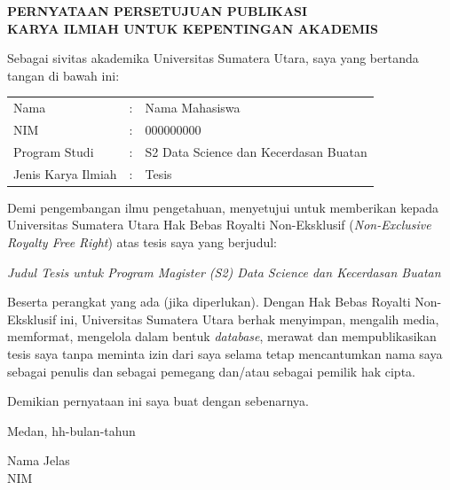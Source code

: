 \thispagestyle{empty}
\begin{center}
{\bfseries PERNYATAAN PERSETUJUAN PUBLIKASI\\
KARYA ILMIAH UNTUK KEPENTINGAN AKADEMIS\par}
\vspace{18mm}
\end{center}

\noindent Sebagai sivitas akademika Universitas Sumatera Utara, saya yang bertanda tangan di bawah ini:

\vspace{6mm}
\noindent
\begin{tabular}{@{}p{3.5cm}@{}l@{\;}l@{}}
Nama            & : & Nama Mahasiswa \\
NIM             & : & 000000000 \\
Program Studi   & : & S2 Data Science dan Kecerdasan Buatan \\
Jenis Karya Ilmiah & : & Tesis \\
\end{tabular}

\vspace{6mm}
\noindent Demi pengembangan ilmu pengetahuan, menyetujui untuk memberikan kepada Universitas Sumatera Utara Hak Bebas Royalti Non-Eksklusif (\textit{Non-Exclusive Royalty Free Right}) atas tesis saya yang berjudul:

\begin{center}
\textit{Judul Tesis untuk Program Magister (S2) Data Science dan Kecerdasan Buatan}
\end{center}

\noindent Beserta perangkat yang ada (jika diperlukan). Dengan Hak Bebas Royalti Non-Eksklusif ini, Universitas Sumatera Utara berhak menyimpan, mengalih media, memformat, mengelola dalam bentuk \textit{database}, merawat dan mempublikasikan tesis saya tanpa meminta izin dari saya selama tetap mencantumkan nama saya sebagai penulis dan sebagai pemegang dan/atau sebagai pemilik hak cipta.

\vspace{6mm}
\noindent Demikian pernyataan ini saya buat dengan sebenarnya.

\vspace{18mm}
\noindent Medan, hh-bulan-tahun

\vspace{18mm}
\noindent Nama Jelas\\
NIM
\clearpage
